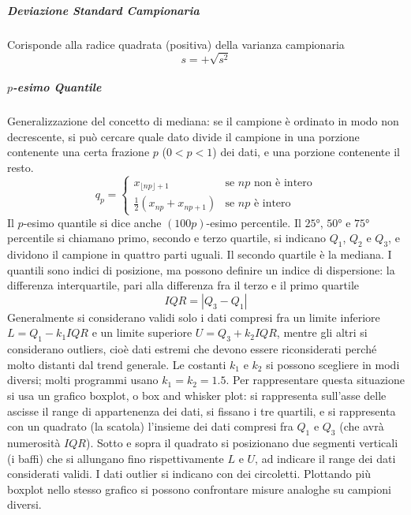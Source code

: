 \documentclass{article}
\theoremstyle{plain}
\theoremstyle{definition}
\theoremstyle{remark}
\begin{document}
\subparagraph{Deviazione Standard Campionaria} %
\label{subp:deviazione_standard_campionaria}
Corisponde alla radice quadrata (positiva) della varianza campionaria
\begin{equation*}
	s=+\sqrt{s^2}
\end{equation*}
\subparagraph{$p$-esimo Quantile} %
\label{subp:p_esimo_quantile}
Generalizzazione del concetto di mediana: se il campione è ordinato in modo non decrescente, si può cercare quale dato divide il campione in una porzione contenente una certa frazione $p$ ($0<p<1$) dei dati, e una porzione contenente il resto.
\begin{equation*}
	q_p=
	\begin{cases}
		x_{\lfloor{np}\rfloor+1}&\text{se }np\text{ non è intero}\\
		\frac{1}{2}(x_{np}+x_{np+1})&\text{se }np\text{ è intero}
	\end{cases}
\end{equation*}
Il $p$-esimo quantile si dice anche $(100p)$-esimo percentile. Il $25°$, $50°$ e $75°$ percentile si chiamano primo, secondo e terzo quartile, si indicano $Q_1$, $Q_2$ e $Q_3$, e dividono il campione in quattro parti uguali. Il secondo quartile è la mediana. I quantili sono indici di posizione, ma possono definire un indice di dispersione: la differenza interquartile, pari alla differenza fra il terzo e il primo quartile
\begin{equation*}
	IQR=|Q_3-Q_1|
\end{equation*}
Generalmente si considerano validi solo i dati compresi fra un limite inferiore $L=Q_1-k_1IQR$ e un limite superiore $U=Q_3+k_2IQR$, mentre gli altri si considerano outliers, cioè dati estremi che devono essere riconsiderati perché molto distanti dal trend generale. Le costanti $k_1$ e $k_2$ si possono scegliere in modi diversi; molti programmi usano $k_1=k_2=1.5$. Per rappresentare questa situazione si usa un grafico boxplot, o box and whisker plot: si rappresenta sull'asse delle ascisse il range di appartenenza dei dati, si fissano i tre quartili, e si rappresenta con un quadrato (la scatola) l'insieme dei dati compresi fra $Q_1$ e $Q_3$ (che avrà numerosità $IQR$). Sotto e sopra il quadrato si posizionano due segmenti verticali (i baffi) che si allungano fino rispettivamente $L$ e $U$, ad indicare il range dei dati considerati validi. I dati outlier si indicano con dei circoletti. Plottando più boxplot nello stesso grafico si possono confrontare misure analoghe su campioni diversi.
\end{document}
